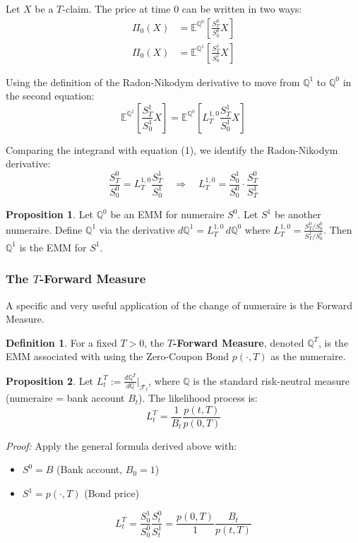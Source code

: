 \documentclass[12pt,a4paper]{article}
\theoremstyle{definition}
\newtheorem{definition}{Definition}[section]
\newtheorem{proposition}{Proposition}[section]
\newcommand{\Q}{\mathbb{Q}}
\newcommand{\E}{\mathbb{E}}
\begin{document}
Let $X$ be a $T$-claim. The price at time 0 can be written in two ways:
\begin{align}
\Pi_0(X) &= \E^{\Q^0}\left[\frac{S_T^0}{S_0^0}X\right] \tag{1}\\
\Pi_0(X) &= \E^{\Q^1}\left[\frac{S_T^1}{S_0^1}X\right]
\end{align}

Using the definition of the Radon-Nikodym derivative to move from $\Q^1$ to $\Q^0$ in the second equation:
\[
\E^{\Q^1}\left[\frac{S_T^1}{S_0^1}X\right] = \E^{\Q^0}\left[L_T^{1,0} \frac{S_T^1}{S_0^1}X\right]
\]

Comparing the integrand with equation (1), we identify the Radon-Nikodym derivative:
\[
\frac{S_T^0}{S_0^0} = L_T^{1,0} \frac{S_T^1}{S_0^1} \quad \Longrightarrow \quad L_T^{1,0} = \frac{S_0^1}{S_0^0} \cdot \frac{S_T^0}{S_T^1}
\]

\begin{proposition}
Let $\Q^0$ be an EMM for numeraire $S^0$. Let $S^1$ be another numeraire. Define $\Q^1$ via the derivative $d\Q^1 = L_T^{1,0}\,d\Q^0$ where $L_T^{1,0} = \frac{S_T^0/S_0^0}{S_T^1/S_0^1}$. Then $\Q^1$ is the EMM for $S^1$.
\end{proposition}

\subsubsection{The $T$-Forward Measure}

A specific and very useful application of the change of numeraire is the Forward Measure.

\begin{definition}
For a fixed $T > 0$, the \textbf{$T$-Forward Measure}, denoted $\Q^T$, is the EMM associated with using the Zero-Coupon Bond $p(\cdot,T)$ as the numeraire.
\end{definition}

\begin{proposition}
Let $L_t^T := \frac{d\Q^T}{d\Q}\big|_{\mathcal{F}_t}$, where $\Q$ is the standard risk-neutral measure (numeraire = bank account $B_t$). The likelihood process is:
\[
L_t^T = \frac{1}{B_t} \frac{p(t,T)}{p(0,T)}
\]
\end{proposition}

\textit{Proof:} Apply the general formula derived above with:
\begin{itemize}
\item $S^0 = B$ (Bank account, $B_0 = 1$)
\item $S^1 = p(\cdot,T)$ (Bond price)
\end{itemize}
\[
L_t^T = \frac{S_0^1}{S_0^0} \frac{S_t^0}{S_t^1} = \frac{p(0,T)}{1} \frac{B_t}{p(t,T)}
\]
\end{document}
